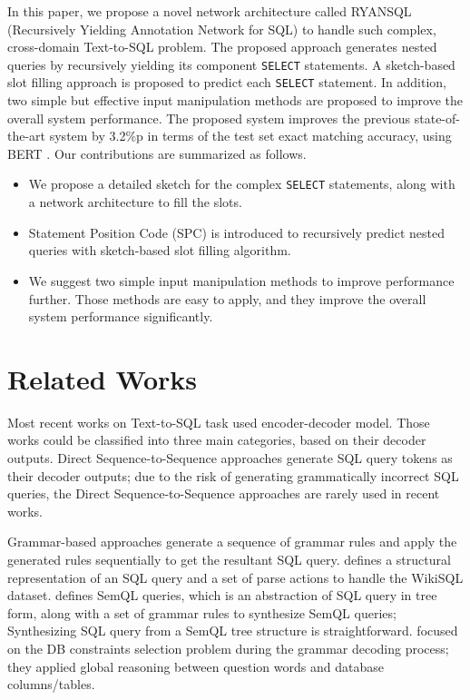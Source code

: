 \documentclass[11pt,a4paper]{article}
\begin{document}
In this paper, we propose a novel network architecture called RYANSQL (Recursively Yielding Annotation Network for SQL) to handle such complex, cross-domain Text-to-SQL problem. The proposed approach generates nested queries by recursively yielding its component \texttt{SELECT} statements. A sketch-based slot filling approach is proposed to predict each \texttt{SELECT} statement. In addition, two simple but effective input manipulation methods are proposed to improve the overall system performance. The proposed system improves the previous state-of-the-art system by 3.2\%p in terms of the test set exact matching accuracy, using BERT \citep{Devlin:19}. Our contributions are summarized as follows.

\begin{itemize}
\item{We propose a detailed sketch for the complex \texttt{SELECT} statements, along with a network architecture to fill the slots. }
\item{Statement Position Code (SPC) is introduced to recursively predict nested queries with sketch-based slot filling algorithm.}
\item{We suggest two simple input manipulation methods to improve performance further. Those methods are easy to apply, and they improve the overall system performance significantly.}
\end{itemize}

\section{Related Works}
\label{sec:related}
Most recent works on Text-to-SQL task used encoder-decoder model. Those works could be classified into three main categories, based on their decoder outputs. Direct Sequence-to-Sequence approaches \citep{dong:16,zhong:17} generate SQL query tokens as their decoder outputs; due to the risk of generating grammatically incorrect SQL queries, the Direct Sequence-to-Sequence approaches are rarely used in recent works. 

Grammar-based approaches generate a sequence of grammar rules and apply the generated rules sequentially to get the resultant SQL query. \citet{incsql} defines a structural representation of an SQL query and a set of parse actions to handle the WikiSQL dataset. \citet{irnet} defines SemQL queries, which is an abstraction of SQL query in tree form, along with a set of grammar rules to synthesize SemQL queries; Synthesizing SQL query from a SemQL tree structure is straightforward. \citet{gnn} focused on the DB constraints selection problem during the grammar decoding process; they applied global reasoning between question words and database columns/tables.
\end{document}
